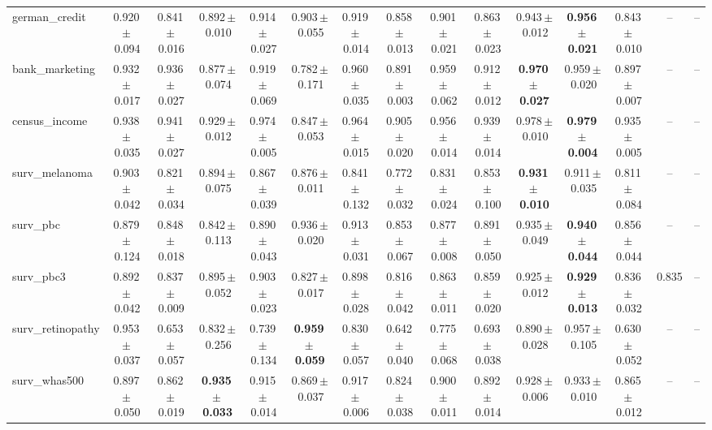 \documentclass[8pt]{extarticle}
\begin{document}
\begin{longtable}{l*{14}{c}}
german\_credit & 0.920\,$\pm$\,0.094 & 0.841\,$\pm$\,0.016 & 0.892\,$\pm$\,0.010 & 0.914\,$\pm$\,0.027 & 0.903\,$\pm$\,0.055 & 0.919\,$\pm$\,0.014 & 0.858\,$\pm$\,0.013 & 0.901\,$\pm$\,0.021 & 0.863\,$\pm$\,0.023 & 0.943\,$\pm$\,0.012 & \textbf{0.956\,$\pm$\,0.021} & 0.843\,$\pm$\,0.010 & -- & -- \\
bank\_marketing & 0.932\,$\pm$\,0.017 & 0.936\,$\pm$\,0.027 & 0.877\,$\pm$\,0.074 & 0.919\,$\pm$\,0.069 & 0.782\,$\pm$\,0.171 & 0.960\,$\pm$\,0.035 & 0.891\,$\pm$\,0.003 & 0.959\,$\pm$\,0.062 & 0.912\,$\pm$\,0.012 & \textbf{0.970\,$\pm$\,0.027} & 0.959\,$\pm$\,0.020 & 0.897\,$\pm$\,0.007 & -- & -- \\
census\_income & 0.938\,$\pm$\,0.035 & 0.941\,$\pm$\,0.027 & 0.929\,$\pm$\,0.012 & 0.974\,$\pm$\,0.005 & 0.847\,$\pm$\,0.053 & 0.964\,$\pm$\,0.015 & 0.905\,$\pm$\,0.020 & 0.956\,$\pm$\,0.014 & 0.939\,$\pm$\,0.014 & 0.978\,$\pm$\,0.010 & \textbf{0.979\,$\pm$\,0.004} & 0.935\,$\pm$\,0.005 & -- & -- \\
surv\_melanoma & 0.903\,$\pm$\,0.042 & 0.821\,$\pm$\,0.034 & 0.894\,$\pm$\,0.075 & 0.867\,$\pm$\,0.039 & 0.876\,$\pm$\,0.011 & 0.841\,$\pm$\,0.132 & 0.772\,$\pm$\,0.032 & 0.831\,$\pm$\,0.024 & 0.853\,$\pm$\,0.100 & \textbf{0.931\,$\pm$\,0.010} & 0.911\,$\pm$\,0.035 & 0.811\,$\pm$\,0.084 & -- & -- \\
surv\_pbc & 0.879\,$\pm$\,0.124 & 0.848\,$\pm$\,0.018 & 0.842\,$\pm$\,0.113 & 0.890\,$\pm$\,0.043 & 0.936\,$\pm$\,0.020 & 0.913\,$\pm$\,0.031 & 0.853\,$\pm$\,0.067 & 0.877\,$\pm$\,0.008 & 0.891\,$\pm$\,0.050 & 0.935\,$\pm$\,0.049 & \textbf{0.940\,$\pm$\,0.044} & 0.856\,$\pm$\,0.044 & -- & -- \\
surv\_pbc3 & 0.892\,$\pm$\,0.042 & 0.837\,$\pm$\,0.009 & 0.895\,$\pm$\,0.052 & 0.903\,$\pm$\,0.023 & 0.827\,$\pm$\,0.017 & 0.898\,$\pm$\,0.028 & 0.816\,$\pm$\,0.042 & 0.863\,$\pm$\,0.011 & 0.859\,$\pm$\,0.020 & 0.925\,$\pm$\,0.012 & \textbf{0.929\,$\pm$\,0.013} & 0.836\,$\pm$\,0.032 & 0.835 & -- \\
surv\_retinopathy & 0.953\,$\pm$\,0.037 & 0.653\,$\pm$\,0.057 & 0.832\,$\pm$\,0.256 & 0.739\,$\pm$\,0.134 & \textbf{0.959\,$\pm$\,0.059} & 0.830\,$\pm$\,0.057 & 0.642\,$\pm$\,0.040 & 0.775\,$\pm$\,0.068 & 0.693\,$\pm$\,0.038 & 0.890\,$\pm$\,0.028 & 0.957\,$\pm$\,0.105 & 0.630\,$\pm$\,0.052 & -- & -- \\
surv\_whas500 & 0.897\,$\pm$\,0.050 & 0.862\,$\pm$\,0.019 & \textbf{0.935\,$\pm$\,0.033} & 0.915\,$\pm$\,0.014 & 0.869\,$\pm$\,0.037 & 0.917\,$\pm$\,0.006 & 0.824\,$\pm$\,0.038 & 0.900\,$\pm$\,0.011 & 0.892\,$\pm$\,0.014 & 0.928\,$\pm$\,0.006 & 0.933\,$\pm$\,0.010 & 0.865\,$\pm$\,0.012 & -- & -- \\

\end{longtable}
\end{document}
